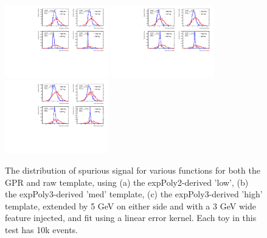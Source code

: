 \begin{figure} 
\begin{center}
  \includegraphics[width=0.4\textwidth]{figures/background/gpr/validation/linear/ToyTest_FitSigVals_lowpT_10k_Sig}   
  \includegraphics[width=0.4\textwidth]{figures/background/gpr/validation/linear/ToyTest_FitSigVals_medpT_10k_Sig}   
  \includegraphics[width=0.4\textwidth]{figures/background/gpr/validation/linear/ToyTest_FitSigVals_highpT_10k_Sig}   
\caption{The distribution of spurious signal for various functions for both the GPR and raw template, using (a) the expPoly2-derived 'low', (b) the expPoly3-derived 'med' template, (c) the expPoly3-derived 'high' template, extended by 5 GeV on either side and with a 3 GeV wide feature injected, and fit using a linear error kernel. Each toy in this test has 10k events.}
\label{fig:linearkernel_lowpt_10k_Sig}
\end{center}
\end{figure}

